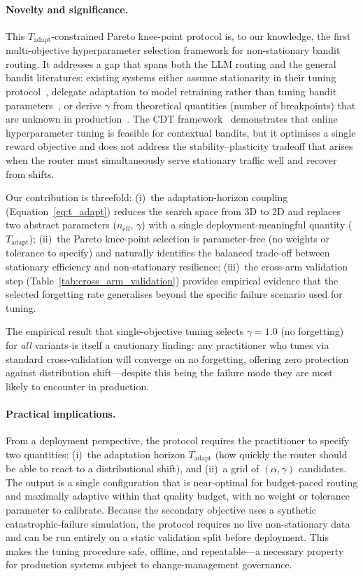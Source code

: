 \paragraph{Novelty and significance.}
This $T_{\text{adapt}}$-constrained Pareto knee-point protocol is, to our
knowledge, the first multi-objective hyperparameter selection
framework for non-stationary bandit routing.
It addresses a gap that spans both the LLM routing and the general
bandit literatures:
existing systems either assume stationarity in their tuning
protocol~\cite{panda2025pilot,wang2025barp,li2025llmbandit},
delegate adaptation to model retraining rather than tuning bandit
parameters~\cite{wang2025mixllm}, or derive $\gamma$ from
theoretical quantities (number of breakpoints) that are unknown in
production~\cite{garivier2011switching}.
The CDT framework~\cite{kang2024cdt} demonstrates that online
hyperparameter tuning is feasible for contextual bandits, but it
optimises a single reward objective and does not address the
stability--plasticity tradeoff that arises when the router must
simultaneously serve stationary traffic well and recover from shifts.

Our contribution is threefold:
(i)~the adaptation-horizon coupling
(Equation~\ref{eq:t_adapt}) reduces the search space from 3D to 2D
and replaces two abstract parameters ($n_{\text{eff}}$, $\gamma$) with a
single deployment-meaningful quantity ($T_{\text{adapt}}$);
(ii)~the Pareto knee-point selection is parameter-free (no weights
or tolerance to specify) and naturally identifies the balanced
trade-off between stationary efficiency and non-stationary
resilience;
(iii)~the cross-arm validation step
(Table~\ref{tab:cross_arm_validation}) provides empirical evidence
that the selected forgetting rate generalises beyond the specific
failure scenario used for tuning.

The empirical result that single-objective tuning
selects $\gamma{=}1.0$ (no forgetting) for \emph{all} variants
is itself a cautionary finding: any practitioner who tunes via
standard cross-validation will converge on no forgetting,
offering zero protection against distribution shift---despite
this being the failure mode they are most likely to encounter
in production.

\paragraph{Practical implications.}
From a deployment perspective, the protocol requires the
practitioner to specify two quantities: (i)~the adaptation horizon
$T_{\text{adapt}}$ (how quickly the router should be able to react to a
distributional shift), and (ii)~a grid of $(\alpha, \gamma)$
candidates.
The output is a single configuration that is
near-optimal for budget-paced routing and maximally adaptive within
that quality budget, with no weight or tolerance parameter to
calibrate.
Because the secondary objective uses a synthetic catastrophic-failure
simulation, the protocol requires no live non-stationary data and
can be run entirely on a static validation split before deployment.
This makes the tuning procedure safe, offline, and repeatable---a
necessary property for production systems subject to change-management
governance.
